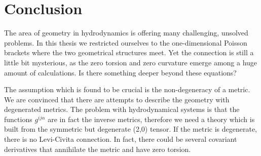 \chapter*{Conclusion}

The area of geometry in hydrodynamics is offering many challenging, unsolved problems. In this thesis we restricted ourselves to the one-dimensional Poisson brackets where the two geometrical structures meet. Yet the connection is still a little bit mysterious, as the zero torsion and zero curvature emerge among a huge amount of calculations. Is there something deeper beyond these equations? 

The assumption which is found to be crucial is the non-degeneracy of a metric. We are convinced that there are attempts to describe the geometry with degenerated metrics. The problem with hydrodynamical systems is that the functions $g^{ij \alpha}$ are in fact the inverse metrics, therefore we need a theory which is built from the symmetric but degenerate (2,0) tensor. If the metric is degenerate, there is no Levi-Civita connection. In fact, there could be several covariant derivatives that annihilate the metric and have zero torsion. 